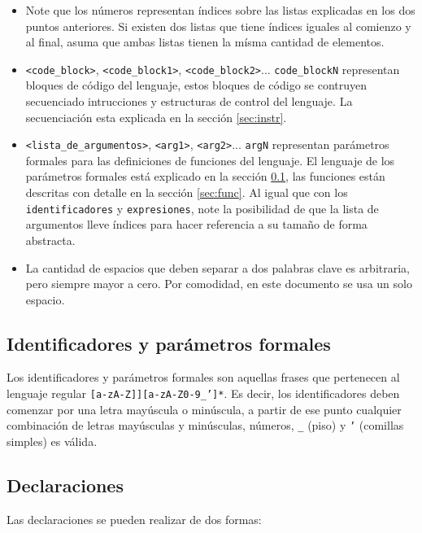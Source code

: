 \documentclass[12pt, spanish]{report}
\begin{document}
\begin{itemize}
\item Note que los números representan índices sobre las listas
  explicadas en los dos puntos anteriores. Si existen dos listas que
  tiene índices iguales al comienzo y al final, asuma que ambas listas
  tienen la mísma cantidad de elementos.
       
\item \texttt{<code\_block>}, \texttt{<code\_block1>},
  \texttt{<code\_block2>}...  \texttt{code\_blockN} representan
  bloques de c\'odigo del lenguaje, estos bloques de c\'odigo se
  contruyen secuenciado intrucciones y estructuras de control del
  lenguaje. La secuenciaci\'on esta explicada en la secci\'on
  \ref{sec:instr}.
       
\item \texttt{<lista\_de\_argumentos>}, \texttt{<arg1>},
  \texttt{<arg2>}...  \texttt{argN} representan par\'ametros formales
  para las definiciones de funciones del lenguaje. El lenguaje de los
  par\'ametros formales est\'a explicado en la secci\'on
  \ref{sec:ident}, las funciones est\'an descritas con detalle en la
  secci\'on \ref{sec:func}. Al igual que con los
  \texttt{identificadores} y \texttt{expresiones}, note la posibilidad
  de que la lista de argumentos lleve índices para hacer referencia a
  su tamaño de forma abstracta.
       
\item La cantidad de espacios que deben separar a dos palabras clave
  es arbitraria, pero siempre mayor a cero. Por comodidad, en este
  documento se usa un solo espacio.
\end{itemize}

\subsection{Identificadores y par\'ametros formales}
\label{sec:ident}
Los identificadores y par\'ametros formales son aquellas frases que
pertenecen al lenguaje regular \texttt{[a-zA-Z]][a-zA-Z0-9\_']*}. Es
decir, los identificadores deben comenzar por una letra may\'uscula o
min\'uscula, a partir de ese punto cualquier combinaci\'on de letras
may\'usculas y min\'usculas, n\'umeros, \texttt{\_} (piso) y
\texttt{'} (comillas simples) es v\'alida.

\subsection{Declaraciones}
\label{sec:decl}

Las declaraciones se pueden realizar de dos formas:\\
\end{document}
